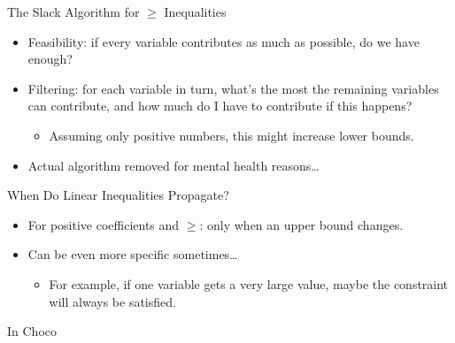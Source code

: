 \documentclass[aspectratio=169,compress,10pt]{beamer}
\begin{document}
\begin{frame}{The Slack Algorithm for $\ge$ Inequalities}
    \begin{itemize}
        \item Feasibility: if every variable contributes as much as possible,
            do we have enough?
        \item Filtering: for each variable in turn, what's the most the
            remaining variables can contribute, and how much do I have to
            contribute if this happens?
            \begin{itemize}
                \item Assuming only positive numbers, this might increase lower bounds.
            \end{itemize}
        \item Actual algorithm removed for mental health reasons\ldots
    \end{itemize}
\end{frame}

\begin{frame}{When Do Linear Inequalities Propagate?}
    \begin{itemize}
        \item For positive coefficients and $\ge$: only when an upper bound changes.
        \item Can be even more specific sometimes\ldots
            \begin{itemize}
                \item For example, if one variable gets a very large value, maybe
                    the constraint will always be satisfied.
            \end{itemize}
    \end{itemize}
\end{frame}

\begin{frame}[fragile]{In Choco}
     {
        
    }
     {
        \begin{minipage}{0.47\paperwidth}
        \end{minipage}\begin{minipage}{0.44\paperwidth}
        \end{minipage}
    }
\end{frame}
\end{document}
